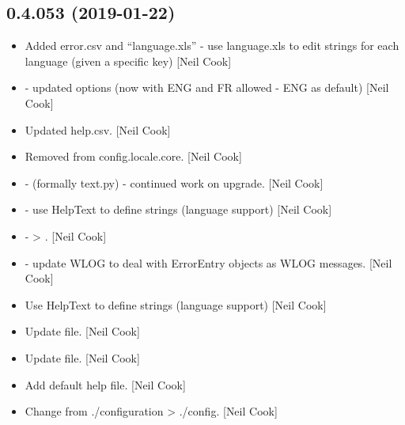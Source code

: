 \documentclass[a4paper,10pt,english]{report}
\begin{document}
\subsection{0.4.053 (2019-01-22)}
\label{\detokenize{misc/changelog:id211}}\begin{itemize}
\item {} 
Added error.csv and “language.xls” - use language.xls to edit strings
for each language (given a specific key) {[}Neil Cook{]}

\item {} 
 - updated options (now with ENG and FR allowed - ENG
as default) {[}Neil Cook{]}

\item {} 
Updated help.csv. {[}Neil Cook{]}

\item {} 
Removed  from config.locale.core. {[}Neil Cook{]}

\item {} 
 - (formally text.py) - continued work on upgrade. {[}Neil
Cook{]}

\item {} 
 - use HelpText to define strings (language
support) {[}Neil Cook{]}

\item {} 
 -  \textendash{}\textgreater{} . {[}Neil Cook{]}

\item {} 
 - update WLOG to deal with ErrorEntry objects as WLOG
messages. {[}Neil Cook{]}

\item {} 
Use HelpText to define strings (language support) {[}Neil Cook{]}

\item {} 
Update  file. {[}Neil Cook{]}

\item {} 
Update  file. {[}Neil Cook{]}

\item {} 
Add default help file. {[}Neil Cook{]}

\item {} 
Change from ./configuration \textendash{}\textgreater{} ./config. {[}Neil Cook{]}


\end{itemize}
\end{document}
